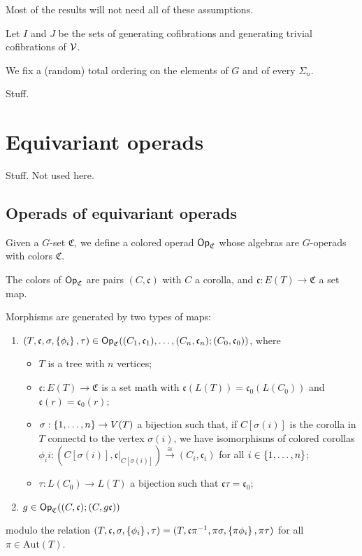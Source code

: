 \documentclass[psamsfonts,oneside,10pt,letterpaper
,draft
]{amsart}%
\renewcommand{\C}{\ensuremath{\mathfrak{C}}}
\renewcommand{\fc}{\ensuremath{\mathfrak{c}}}
\renewcommand{\1}{\ensuremath{\mathbb{id}}}
\begin{document}
Most of the results will not need all of these assumptions.

Let $I$ and $J$ be the sets of generating cofibrations and generating trivial cofibrations of $\mathcal V$.

\begin{notation}
      We fix a (random) total ordering on the elements of $G$ and of every $\Sigma_n$.
\end{notation}

Stuff.

\newpage
\section{Equivariant operads}

Stuff.
Not used here.

\subsection{Operads of equivariant operads}

Given a $G$-set $\C$, we define a colored operad $\Op_\C$ whose algebras are $G$-operads with colors $\C$.

The colors of $\Op_\C$ are pairs $(C,\fc)$ with $C$ a corolla, and $\fc: E(T) \to \C$ a set map.

Morphisms are generated by two types of maps:
\begin{enumerate}
\item $(T,\fc,\sigma,\set{\phi_i},\tau)\in \Op_\C((C_1,\fc_1), \ldots, (C_n,\fc_n); (C_0,\fc_0))$, where
      \begin{itemize}
      \item $T$ is a tree with $n$ vertices;
      \item $\fc: E(T)\to \C$ is a set math with $\fc(L(T)) = \fc_0(L(C_0))$ and $\fc(r) = \fc_0(r)$;
      \item $\sigma: \left\{1,\ldots, n\right\}\to V(T)$ a bijection such that, if $C[\sigma(i)]$ is the corolla in $T$ connectd to the vertex $\sigma(i)$, we have isomorphisms of colored corollas $\phi_ii: (C[\sigma(i)], \fc|_{C[\sigma(i)]})\xrightarrow{\cong} (C_i, \fc_i)$ for all $i\in \left\{1,\ldots, n\right\}$;
      \item $\tau: L(C_0)\to L(T)$ a bijection such that $\fc\tau = \fc_0$;
      \end{itemize}
\item $g\in \Op_\C((C,\fc); (C,g\fc))$
\end{enumerate}
modulo the relation $(T,\fc,\sigma,\set{\phi_i},\tau) = (T,\fc\pi^{-1},\pi\sigma,\set{\pi\phi_i},\pi\tau)$ for all $\pi\in \mathrm{Aut}(T)$.
\end{document}
